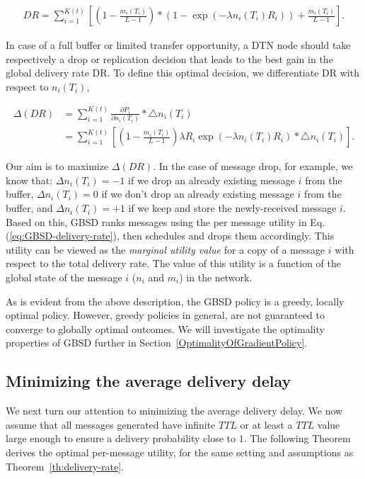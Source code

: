 \vspace{-0.4cm}
\small
\begin{align*} DR =\sum_{i=1}^{K(t)}\left[(1 - \frac{m_i(T_i)}{L-1})*(1 -\exp(-\lambda n_i(T_i)  R_i )) +\frac{m_i(T_i)}{L-1}\right].
\end{align*}
\normalsize

In case of a full buffer or limited transfer opportunity, a DTN node should take respectively a drop or replication decision that leads to the best gain in the global delivery rate DR. To define this optimal decision, we differentiate DR with respect to $n_i(T_i)$,

\small
\begin{align*}
\Delta(DR) &= \sum_{i=1}^{K(t)}{\frac{\partial P_i}{\partial n_i(T_i)} * \bigtriangleup n_i(T_i)}
\\&= \sum_{i=1}^{K(t)} \left[{(1-\frac{m_i(T_i)}{L-1})\lambda R_i\exp(-\lambda n_i(T_i) R_i) * \bigtriangleup n_i(T_i)}\right].
\end{align*}
\normalsize

Our aim is to maximize $\Delta(DR)$. In the case of message drop, for example, we know that: $\Delta n_i(T_i) = -1$ if we drop an already existing message $i$ from the buffer, $\Delta n_i(T_i) = 0$ if we don't drop an already existing message $i$ from the buffer, and $\Delta n_i(T_i) = +1$ if we keep and store the newly-received message $i$. Based on this, GBSD ranks messages using the per message utility in Eq.(\ref{eq:GBSD-delivery-rate}), then schedules and drops them accordingly. This utility can be viewed as the \emph{marginal utility value} for a copy of a message $i$ with respect to the total delivery rate. The value of this utility is a function of the global state of the message $i$ ($n_i$ and $m_i$) in the network.

As is evident from the above description, the GBSD policy is a greedy, locally optimal policy. However, greedy policies in general, are not guaranteed to converge to globally optimal outcomes. We will investigate the optimality properties of GBSD further in Section~\ref{OptimalityOfGradientPolicy}.

\subsection{Minimizing the average delivery delay}
\label{subsec:MinAvgDeliveryDelay}

We next turn our attention to minimizing the average delivery delay. We now assume that all messages generated have infinite $TTL$ or at least a $TTL$ value large enough to ensure a delivery probability close to $1$. The following Theorem derives the optimal per-message utility, for the same setting and assumptions as Theorem~\ref{th:delivery-rate}.

